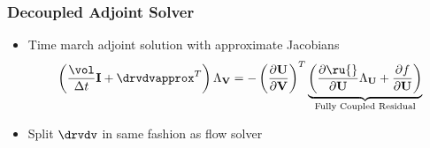 \documentclass{beamer}
\begin{document}
\begin{frame}
  \frametitle{Decoupled Adjoint Solver}
  \begin{itemize}
    \item Time march adjoint solution with approximate Jacobians
      \begin{equation*}
        \left( \frac{\vol}{\Delta t} \mi + \drvdvapprox^T \right) \adjlam{\mv}
        =
        - \left( \pd{\mU}{\mv} \right)^T
        \underbrace{
          \left( \pd{\ru{}}{\mU} \adjlam{\mU} + \pd{f}{\mU} \right)
        }_\text{Fully Coupled Residual}
      \end{equation*}
    \item Split $\drvdv$ in same fashion as flow solver
  \end{itemize}
\end{frame}
\end{document}
